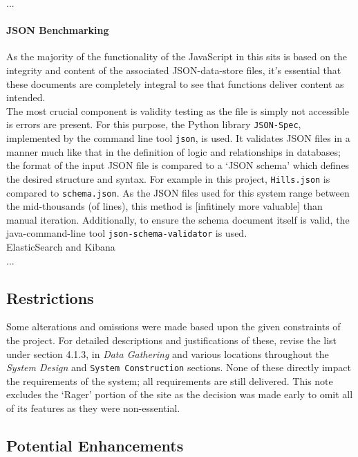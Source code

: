\documentclass[11pt, english]{article}
\begin{document}
	...

			\paragraph{JSON Benchmarking}

	As the majority of the functionality of the JavaScript in this sits is based on the integrity and content of the associated JSON-data-store files, it's essential that these documents are completely integral to see that functions deliver content as intended.\\

			The most crucial component is validity testing as the file is simply not accessible is errors are present. For this purpose, the Python library \texttt{JSON-Spec}, implemented by the command line tool \texttt{json}, is used. It validates JSON files in a manner much like that in the definition of logic and relationships in databases; the format of the input JSON file is compared to a `JSON schema' which defines the desired structure and syntax. For example in this project, \texttt{Hills.json} is compared to \texttt{schema.json}. As the JSON files used for this system range between the mid-thousands (of lines), this method is [infitinely more valuable] than manual iteration. Additionally, to ensure the schema document itself is valid, the java-command-line tool \texttt{json-schema-validator} is used.\\

	ElasticSearch and Kibana\\

	...

	\subsection{Restrictions}

	Some alterations and omissions were made based upon the given constraints of the project. For detailed descriptions and justifications of these, revise the list under section 4.1.3, in \textit{Data Gathering} and various locations throughout the \textit{System Design} and \texttt{System Construction} sections. None of these directly impact the requirements of the system; all requirements are still delivered. This note excludes the `Rager' portion of the site as the decision was made early to omit all of its features as they were non-essential.

	\subsection{Potential Enhancements}
\end{document}

